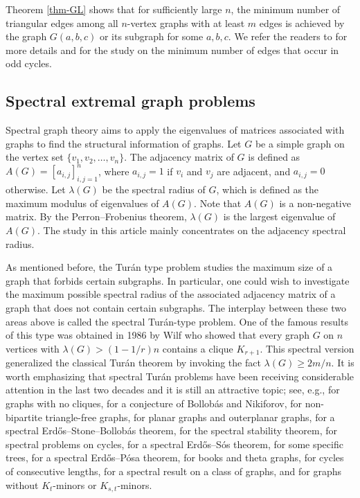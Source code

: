 \documentclass[11pt]{article}
\begin{document}
Theorem \ref{thm-GL} shows that  for sufficiently large $n$, 
the minimum number of triangular edges among all 
 $n$-vertex graphs with at least 
$m$ edges is achieved by the graph $G(a,b,c)$ or its subgraph 
for some $a,b,c$. 
We refer the readers to \cite{GL2018}   
for more details  and \cite{GHV2019} 
for the study on the minimum number of edges that occur in odd cycles. 





\subsection{Spectral extremal graph problems}

Spectral graph theory aims to apply the eigenvalues of matrices associated
with graphs to find the structural information of graphs. 
Let $G$ be a simple graph on the vertex set $\{v_1,v_2,\ldots ,v_n\}$. The adjacency matrix of 
$G$ is defined as $A(G)=[a_{i,j}]_{i,j=1}^n$, 
where $a_{i,j}=1$ if $v_i$ and $v_j$ are adjacent, and $a_{i,j}=0$ otherwise. 
Let $\lambda (G)$ be the spectral radius 
of $G$, which is defined as the maximum modulus 
of eigenvalues of $A(G)$. 
Note that $A(G)$ is a non-negative matrix. 
By the Perron--Frobenius theorem, $\lambda (G)$ is the largest eigenvalue of $A(G)$. 
The study in this article mainly concentrates on the adjacency spectral radius.  

\medskip 
As mentioned before, 
the Tur\'{a}n type problem studies the maximum size of 
a graph that forbids certain subgraphs. 
In particular, one could wish to investigate the maximum possible spectral radius of the associated adjacency matrix of a graph that does not contain certain subgraphs.  
The interplay between these two areas above
is called the spectral Tur\'{a}n-type problem.   
One of the famous results of this type was obtained 
in 1986 by Wilf \cite{Wil1986} who showed that 
every graph $G$ on $n$ vertices with 
$\lambda (G) > (1- {1}/{r})n$ contains  
a clique $K_{r+1}$. 
This spectral version generalized the classical Tur\'{a}n theorem  
by invoking the fact  $\lambda (G) \ge 2m/n$. 
It is worth emphasizing that spectral Tur\'{a}n problems have been receiving considerable 
attention in the last two decades 
and it is still an attractive topic; see, e.g., 
\cite{Wil1986,Niki2002cpc,Niki2007laa2,LP2022second} for graphs with no cliques, \cite{BN2007jctb,LNW2021,ZhangST2024,ELW2024} for a conjecture of Bollob\'{a}s and Nikiforov, 
\cite{LNW2021,ZS2022dm,LFP2023-solution} for non-bipartite triangle-free graphs, 
\cite{TT2017,LN2021outplanar} for planar graphs and outerplanar graphs, 
\cite{Niki2009cpc} for a spectral Erd\H{o}s--Stone--Bollob\'{a}s theorem,  
\cite{Niki2009jgt} for the spectral stability theorem, 
\cite{CDT2023-even-cycle,LZS2024} 
for spectral problems on cycles, 
\cite{CDT2023} for a spectral Erd\H{o}s--S\'{o}s theorem, 
\cite{FLSZ2024} for some specific trees, 
\cite{ZL2022} for a spectral Erd\H{o}s--P\'{o}sa theorem, 
\cite{ZL2022jgt,Niki2021} for books and theta graphs, 
\cite{LN2023,Zhang2024} for cycles of consecutive lengths, 
\cite{Wang2022} for a spectral result 
on a class of graphs, and 
 \cite{Tait2019,ZL2022jctb} for graphs without 
 $K_t$-minors or $K_{s,t}$-minors. 
\end{document}
